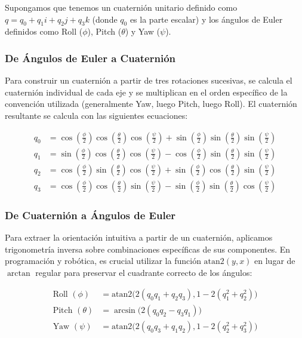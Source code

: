 Supongamos que tenemos un cuaternión unitario definido como $q = q_0 + q_1i + q_2j + q_3k$ (donde $q_0$ es la parte escalar) y los ángulos de Euler definidos como Roll ($\phi$), Pitch ($\theta$) y Yaw ($\psi$).

\subsubsection{De Ángulos de Euler a Cuaternión}
Para construir un cuaternión a partir de tres rotaciones sucesivas, se calcula el cuaternión individual de cada eje y se multiplican en el orden específico de la convención utilizada (generalmente Yaw, luego Pitch, luego Roll). El cuaternión resultante se calcula con las siguientes ecuaciones:

\begin{align}
    q_0 &= \cos\left(\frac{\phi}{2}\right)\cos\left(\frac{\theta}{2}\right)\cos\left(\frac{\psi}{2}\right) + \sin\left(\frac{\phi}{2}\right)\sin\left(\frac{\theta}{2}\right)\sin\left(\frac{\psi}{2}\right) \\
    q_1 &= \sin\left(\frac{\phi}{2}\right)\cos\left(\frac{\theta}{2}\right)\cos\left(\frac{\psi}{2}\right) - \cos\left(\frac{\phi}{2}\right)\sin\left(\frac{\theta}{2}\right)\sin\left(\frac{\psi}{2}\right) \\
    q_2 &= \cos\left(\frac{\phi}{2}\right)\sin\left(\frac{\theta}{2}\right)\cos\left(\frac{\psi}{2}\right) + \sin\left(\frac{\phi}{2}\right)\cos\left(\frac{\theta}{2}\right)\sin\left(\frac{\psi}{2}\right) \\
    q_3 &= \cos\left(\frac{\phi}{2}\right)\cos\left(\frac{\theta}{2}\right)\sin\left(\frac{\psi}{2}\right) - \sin\left(\frac{\phi}{2}\right)\sin\left(\frac{\theta}{2}\right)\cos\left(\frac{\psi}{2}\right) 
\end{align}

\subsubsection{De Cuaternión a Ángulos de Euler}
Para extraer la orientación intuitiva a partir de un cuaternión, aplicamos trigonometría inversa sobre combinaciones específicas de sus componentes. En programación y robótica, es crucial utilizar la función $\text{atan2}(y, x)$ en lugar de $\arctan$ regular para preservar el cuadrante correcto de los ángulos:

\begin{align}
    \text{Roll } (\phi) &= \text{atan2}\big(2(q_0 q_1 + q_2 q_3), 1 - 2(q_1^2 + q_2^2)\big) \\
    \text{Pitch } (\theta) &= \arcsin\big(2(q_0 q_2 - q_3 q_1)\big) \\
    \text{Yaw } (\psi) &= \text{atan2}\big(2(q_0 q_3 + q_1 q_2), 1 - 2(q_2^2 + q_3^2)\big)
\end{align}


